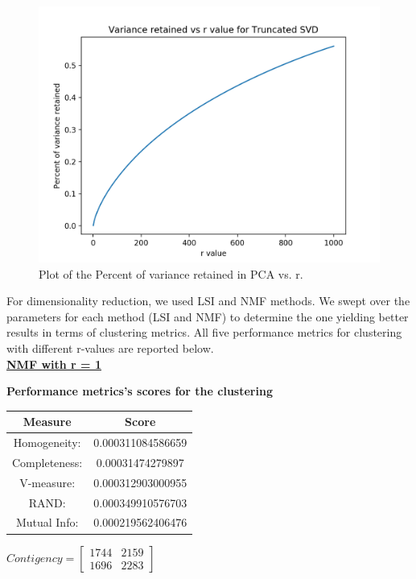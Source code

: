 \documentclass{report}
\begin{document}
\begin{figure}
  \centering
  \includegraphics[width=\linewidth]{p3_variance_r.png}
  \vspace*{-20mm}
  \caption{Plot of the Percent of variance retained in PCA vs. r.}
  \label{fig:variance_r}
\end{figure}

For dimensionality reduction, we used LSI and NMF methods. We swept over the parameters for each method (LSI and NMF) to determine the one yielding better results in terms of clustering metrics. All five performance metrics for clustering with different r-values are reported below. \\


\underline{\textbf{NMF with r = 1}} 

\begin{center}
	\textbf{Performance metrics's scores for the clustering} \\ \vspace{10pt}
	\begin{tabular}{*{2}{c}}
		\toprule
		\textbf{Measure} & \textbf{Score} \\
		\midrule	
		Homogeneity: & 0.000311084586659 \\
		\midrule
		Completeness: & 0.00031474279897 \\
		\midrule
		V-measure: & 0.000312903000955 \\
		\midrule
		RAND: & 0.000349910576703 \\
		\midrule
		Mutual Info: & 0.000219562406476 \\
		\bottomrule
	\end{tabular}
	\qquad
	$Contigency = \left[ \begin{array}{*{2}{c}}
			    1744 & 2159\\
			    1696 & 2283				
				\end{array}\right]
			$
\end{center}
\end{document}
